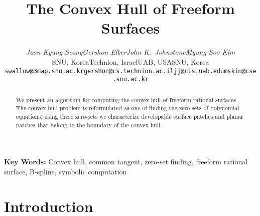 \documentclass[11pt]{article}          %
\begin{document}
\title{\bf The Convex Hull of Freeform Surfaces}

\author{\begin{tabular}{cccc}
           {\em Joon-Kyung Seong} & {\em Gershon Elber} & 
              {\em John K.~Johnstone} & {\em Myung-Soo Kim} \\
           {\small SNU, Korea} & 
              {\small Technion, Israel} &
              {\small UAB, USA} &
              {\small SNU, Korea} \\
           {\small {\tt swallow@3map.snu.ac.kr}} & 
              {\small {\tt gershon@cs.technion.ac.il}} & 
              {\small {\tt jj@cis.uab.edu}} & 
              {\small {\tt mskim@cse.snu.ac.kr}}
        \end{tabular}}

\date{}

%
%
%

\maketitle

\begin{abstract}
\noindent
   We present an algorithm for computing the convex hull of
   freeform rational surfaces.  The convex hull problem is reformulated
   as one of finding the zero-sets of polynomial equations;
   using these zero-sets
   we characterize developable surface patches and planar patches
   that belong to the boundary of the convex hull.
\end{abstract}

\noindent
{\bf Key Words:}
Convex hull, common tangent, zero-set finding,
freeform rational surface, B-spline, symbolic computation



\section{Introduction}
\end{document}
